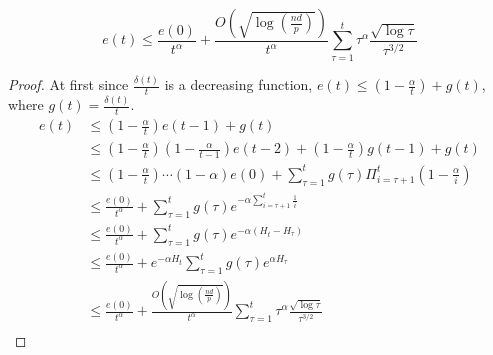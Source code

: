 \begin{lemma}
$$e(t) \leq \frac{e(0)}{t^\alpha} + \frac{O(\sqrt{\log(\frac{nd}{p})})}{t^\alpha}\sum_{\tau=1}^t\tau^\alpha\frac{\sqrt{\log \tau}}{\tau^{3/2}}$$
\end{lemma}

\begin{proof}
At first since $\frac{\delta(t)}{t}$ is a decreasing function, $e(t)\leq (1-\frac{\alpha}{t}) + g(t)$, where $g(t)=\frac{\delta(t)}{t}$.
\begin{align*}
 e(t)
 &\leq (1-\frac{\alpha}{t})e(t-1) + g(t)\\
 &\leq (1-\frac{\alpha}{t})(1-\frac{\alpha}{t-1})e(t-2) + (1-\frac{\alpha}{t})g(t-1) + g(t)\\
 &\leq (1-\frac{\alpha}{t})\cdots (1-\alpha)e(0) + \sum_{\tau=1}^t g(\tau)\Pi_{i=\tau+1}^t(1-\frac{\alpha}{i})\\
 &\leq \frac{e(0)}{t^\alpha} + \sum_{\tau=1}^tg(\tau)e^{-\alpha\sum_{i=\tau+1}^t\frac{1}{i}}\\
 &\leq \frac{e(0)}{t^\alpha} + \sum_{\tau=1}^tg(\tau)e^{-\alpha(H_t-H_{\tau})}\\
 &\leq \frac{e(0)}{t^\alpha} + e^{-\alpha H_t}\sum_{\tau=1}^tg(\tau)e^{\alpha H_{\tau}}\\
 &\leq \frac{e(0)}{t^\alpha} + \frac{O(\sqrt{\log(\frac{nd}{p})})}{t^\alpha}\sum_{\tau=1}^t\tau^\alpha\frac{\sqrt{\log \tau}}{\tau^{3/2}}\\
\end{align*}

\end{proof}

